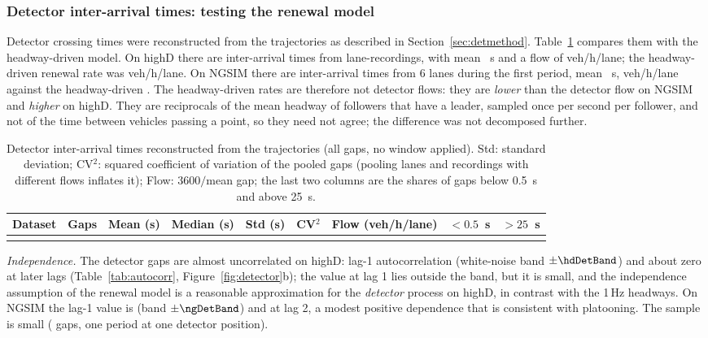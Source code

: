 \documentclass[11pt,a4paper]{article}
\numberwithin{equation}{section}
\begin{document}
\subsubsection{Detector inter-arrival times: testing the renewal model}\label{sec:detector}
Detector crossing times were reconstructed from the trajectories as described in Section~\ref{sec:detmethod}. Table~\ref{tab:detgaps} compares them with the headway-driven model. On highD there are \hdDetN{} inter-arrival times from \hdDetUnits{} lane-recordings, with mean \hdDetMean~s and a flow of \hdDetFlow{} veh/h/lane; the headway-driven renewal rate was \hdFlow{} veh/h/lane.
On NGSIM there are \ngDetN{} inter-arrival times from 6 lanes during the first period, mean \ngDetMean~s, \ngDetFlow{} veh/h/lane against the headway-driven \ngFlow. The headway-driven rates are therefore not detector flows: they are \emph{lower} than the detector flow on NGSIM and \emph{higher} on highD. They are reciprocals of the mean headway of followers that have a leader, sampled once per second per follower, and not of the time between vehicles passing a point, so they need not agree; the difference was not decomposed further.
\begin{table}[H]
\centering\footnotesize
\setlength{\tabcolsep}{3.5pt}
\caption{Detector inter-arrival times reconstructed from the trajectories (all gaps, no window applied). Std: standard deviation; CV$^2$: squared coefficient of variation of the pooled gaps (pooling lanes and recordings with different flows inflates it); Flow: $3600/$mean gap; the last two columns are the shares of gaps below 0.5~s and above 25~s.}
\label{tab:detgaps}
\begin{tabular}{@{}lrrrrrrrr@{}}
\toprule
Dataset & Gaps & Mean (s) & Median (s) & Std (s) & CV$^2$ & Flow (veh/h/lane) & $<0.5$~s & $>25$~s \\
\midrule
\\
\bottomrule
\end{tabular}
\end{table}

\emph{Independence.} The detector gaps are almost uncorrelated on highD: lag-1 autocorrelation \hdDetLagOne{} (white-noise band $\pm\hdDetBand$) and about zero at later lags (Table~\ref{tab:autocorr}, Figure~\ref{fig:detector}b); the value at lag 1 lies outside the band, but it is small, and
the independence assumption of the renewal model is a reasonable approximation for the \emph{detector} process on highD, in contrast with the 1\,Hz headways. On NGSIM the lag-1 value is \ngDetLagOne{} (band $\pm\ngDetBand$) and \ngDetLagTwo{} at lag 2, a modest positive dependence that is consistent with platooning. The sample is small (\ngDetN{} gaps, one period at one detector position).
\end{document}
